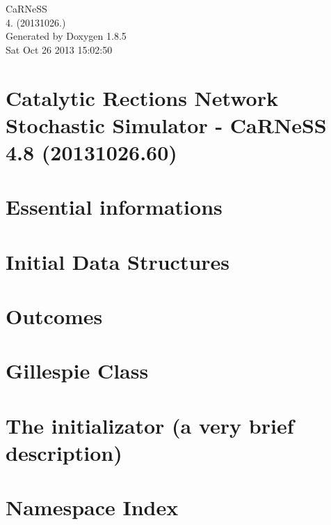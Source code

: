 \documentclass[twoside]{book}
\newcommand{\clearemptydoublepage}{%
  \newpage{\pagestyle{empty}\cleardoublepage}%
}
\begin{document}
\hypersetup{pageanchor=false}
\begin{titlepage}
\vspace*{7cm}
\begin{center}%
{\Large Ca\-R\-Ne\-S\-S \\[1ex]\large 4. (20131026.) }\\
\vspace*{1cm}
{\large Generated by Doxygen 1.8.5}\\
\vspace*{0.5cm}
{\small Sat Oct 26 2013 15:02:50}\\
\end{center}
\end{titlepage}
\clearemptydoublepage
\tableofcontents
\clearemptydoublepage
{}
\hypersetup{pageanchor=true}

\chapter{Catalytic Rections Network Stochastic Simulator -\/ Ca\-R\-Ne\-S\-S 4.8 (20131026.60)}
\label{index}\hypertarget{index}{}
\chapter{Essential informations}
\label{intro}
\hypertarget{intro}{}

\chapter{Initial Data Structures}
\label{page_init_str}
\hypertarget{page_init_str}{}

\chapter{Outcomes}
\label{pageoutcomes}
\hypertarget{pageoutcomes}{}

\chapter{Gillespie Class}
\label{page_gillespie}
\hypertarget{page_gillespie}{}

\chapter{The initializator (a very brief description)}
\label{page_initializator}
\hypertarget{page_initializator}{}

\chapter{Namespace Index}

\end{document}
